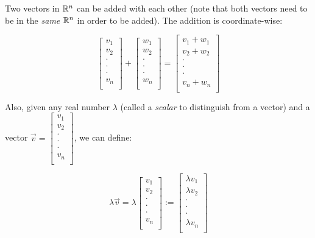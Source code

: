 \documentclass[10pt]{amsart}
\begin{document}
Two vectors in $\mathbb{R}^n$ can be added with each other (note that both
vectors need to be in the {\em same} $\mathbb{R}^n$ in order to be added). The
addition is coordinate-wise:

$$\left[\begin{matrix} v_1 \\ v_2 \\ \cdot \\ \cdot \\ \cdot \\ v_n \\\end{matrix}\right] + \left[\begin{matrix} w_1 \\ w_2 \\ \cdot \\ \cdot \\ \cdot \\ w_n \\\end{matrix}\right] = \left[\begin{matrix} v_1 + w_1 \\ v_2 + w_2 \\ \cdot \\ \cdot \\ \cdot \\ v_n + w_n \\\end{matrix}\right]$$

Also, given any real number $\lambda$ (called a {\em scalar} to
distinguish from a vector) and a vector $\vec{v} = \left[\begin{matrix} v_1 \\ v_2 \\ \cdot \\ \cdot \\ \cdot \\ v_n \\\end{matrix}\right]$, we can define:

$$\lambda \vec{v} = \lambda\left[\begin{matrix} v_1 \\ v_2 \\ \cdot \\ \cdot \\ \cdot \\ v_n \\\end{matrix}\right] := \left[\begin{matrix} \lambda v_1 \\ \lambda v_2 \\ \cdot \\ \cdot \\ \cdot \\ \lambda v_n \\\end{matrix}\right]$$
\end{document}

